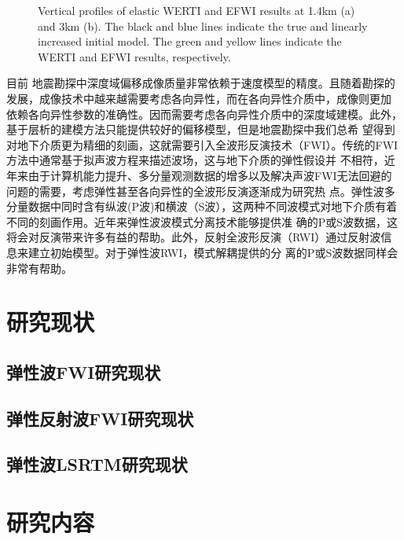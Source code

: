 \begin{figure}[!htb] 
   \centering 
   \caption{Vertical profiles of elastic WERTI and EFWI results at 1.4km (a) and
       3km (b). The black and blue lines indicate the true and linearly         increased
       initial model. The green and yellow lines indicate the WERTI and EFWI    results,
       respectively.
   }
   \label{fig:GapInSeisVel}
\end{figure}
目前
地震勘探中深度域偏移成像质量非常依赖于速度模型的精度。且随着勘探的发展，成像技术中越来越需要考虑各向异性，而在各向异性介质中，成像则更加
依赖各向异性参数的准确性。因而需要考虑各向异性介质中的深度域建模。此外，基于层析的建模方法只能提供较好的偏移模型，但是地震勘探中我们总希
望得到对地下介质更为精细的刻画，这就需要引入全波形反演技术（FWI）。传统的FWI方法中通常基于拟声波方程来描述波场，这与地下介质的弹性假设并
不相符，近年来由于计算机能力提升、多分量观测数据的增多以及解决声波FWI无法回避的问题的需要，考虑弹性甚至各向异性的全波形反演逐渐成为研究热
点。弹性波多分量数据中同时含有纵波(P波)和横波（S波），这两种不同波模式对地下介质有着不同的刻画作用。近年来弹性波波模式分离技术能够提供准
确的P或S波数据，这将会对反演带来许多有益的帮助。此外，反射全波形反演（RWI）通过反射波信息来建立初始模型。对于弹性波RWI，模式解耦提供的分
离的P或S波数据同样会非常有帮助。
\section{研究现状}
\subsection{弹性波FWI研究现状}
\subsection{弹性反射波FWI研究现状}
\subsection{弹性波LSRTM研究现状}
\section{研究内容}
